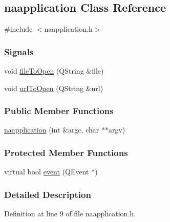 \hypertarget{classnaapplication}{\subsection{naapplication \-Class \-Reference}
\label{classnaapplication}
}


{\ttfamily \#include $<$naapplication.\-h$>$}

\subsubsection*{\-Signals}
\begin{DoxyCompactItemize}
\item 
void \hyperlink{classnaapplication_a93d863c2e87e2cdfde862c498e7a9569}{file\-To\-Open} (\-Q\-String \&file)
\item 
void \hyperlink{classnaapplication_a6313292b306f210b04127c720533629c}{url\-To\-Open} (\-Q\-String \&url)
\end{DoxyCompactItemize}
\subsubsection*{\-Public \-Member \-Functions}
\begin{DoxyCompactItemize}
\item 
\hyperlink{classnaapplication_acd4769f83f983ced8e1c36857cade294}{naapplication} (int \&argc, char $\ast$$\ast$argv)
\end{DoxyCompactItemize}
\subsubsection*{\-Protected \-Member \-Functions}
\begin{DoxyCompactItemize}
\item 
virtual bool \hyperlink{classnaapplication_a902a074ff245698124dffce9dba0a800}{event} (\-Q\-Event $\ast$)
\end{DoxyCompactItemize}


\subsubsection{\-Detailed \-Description}


\-Definition at line 9 of file naapplication.\-h.



